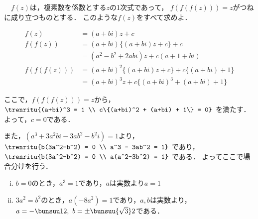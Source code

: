 \begin{problem}
　$f(z)$は，複素数を係数とする$z$の1次式であって，
$f(f(f(z)))=z$がつねに成り立つものとする．
このような$f(z)$をすべて求めよ．
\end{problem}



\begin{align*}
  f(z) &= (a+bi)z + c \\
  f(f(z)) &= (a+bi)\{(a+bi)z + c\} + c \\
  &= (a^2 - b^2 + 2abi)z + c(a + 1 + bi) \\
  f(f(f(z))) &= (a+bi)^2\{(a+bi)z + c\} + c\{(a+bi) + 1\} \\
  &= (a+bi)^3 z + c\{(a+bi)^3 + (a+bi) + 1\}
\end{align*}

ここで，$f(f(f(z))) = z$から，
$\trenritu{(a+bi)^3 = 1 \\ c\{(a+bi)^2 + (a+bi) + 1\} = 0}$
を満たす．よって，$c=0$である．

また，$(a^3+3a^2bi - 3ab^2 - b^2i) = 1$より，
$\trenritu{b(3a^2-b^2) = 0 \\ a^3 - 3ab^2 = 1}$ であり，
$\trenritu{b(3a^2-b^2) = 0 \\ a(a^2-3b^2) = 1}$ である．
よってここで場合分けを行う．

\begin{enumerate}[(i)]
  \item $b=0$のとき，$a^3 = 1$であり，$a$は実数より$a=1$
  \item $3a^2 = b^2$のとき，$a(-8a^2) = 1$であり，$a,b$は実数より，
  $a = -\bunsuu12,\ b=\pm \bunsuu{\sqrt{3}}2$である．
\end{enumerate}

